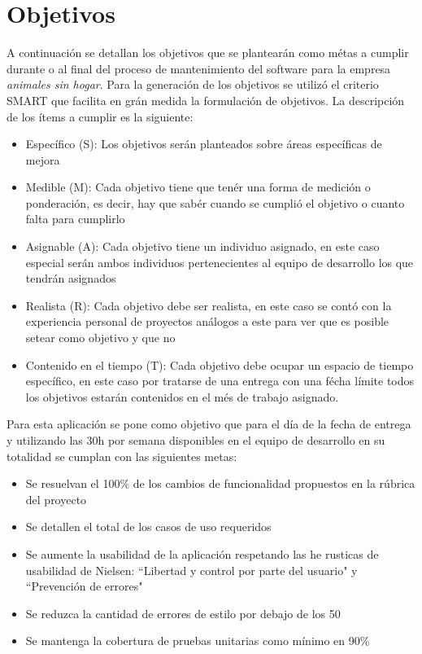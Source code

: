 \section{Objetivos}
A continuación se detallan los objetivos que se plantearán como métas a cumplir durante o al final del proceso de mantenimiento del software para la empresa \textit{animales sin hogar}. Para la generación de los objetivos se utilizó el criterio SMART que facilita en grán medida la formulación de objetivos. La descripción de los ítems a cumplir es la siguiente:

\begin{itemize}
    \item Específico (S): Los objetivos serán planteados sobre áreas específicas de mejora
    \item Medible (M): Cada objetivo tiene que tenér una forma de medición o ponderación, es decir, hay que sabér cuando se cumplió el objetivo o cuanto falta para cumplirlo
    \item Asignable (A): Cada objetivo tiene un individuo asignado, en este caso especial serán ambos individuos pertenecientes al equipo de desarrollo los que tendrán asignados
    \item Realista (R): Cada objetivo debe ser realista, en este caso se contó con la experiencia personal de proyectos análogos a este para ver que es posible setear como objetivo y que no
    \item Contenido en el tiempo (T): Cada objetivo debe ocupar un espacio de tiempo específico, en este caso por tratarse de una entrega con una fécha límite todos los objetivos estarán contenidos en el més de trabajo asignado.
\end{itemize}

Para esta aplicación se pone como objetivo que para el día de la fecha de entrega y utilizando las 30h por semana disponibles en el equipo de desarrollo en su totalidad se cumplan con las siguientes metas:
\begin{itemize}
    \item Se resuelvan el 100\% de los cambios de funcionalidad propuestos en la rúbrica del proyecto
    \item Se detallen el total de los casos de uso requeridos
    \item Se aumente la usabilidad de la aplicación respetando las he rusticas de usabilidad de Nielsen: ``Libertad y control por parte del usuario" y ``Prevención de errores"
    \item Se reduzca la cantidad de errores de estilo por debajo de los 50
    \item Se mantenga la cobertura de pruebas unitarias como mínimo en 90\%
\end{itemize}
  

